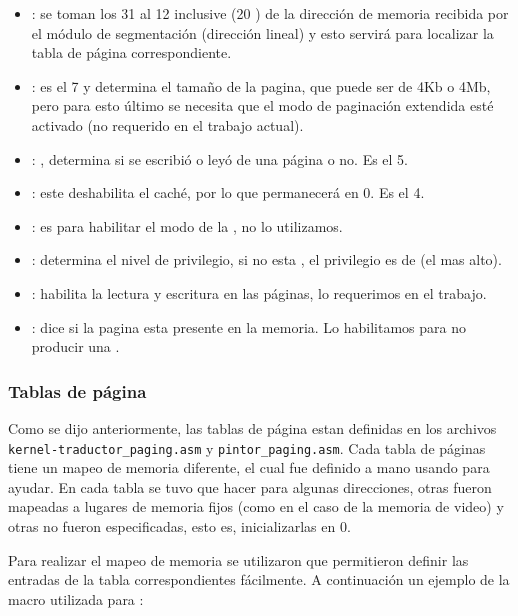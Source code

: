 \begin{itemize}
	\item{}: se toman los  31 al 12 inclusive (20 ) de la dirección de memoria recibida por el módulo 
de segmentación (dirección lineal) y esto servirá para localizar la tabla de página correspondiente.
	\item{}: es el  7 y determina el tamaño de la pagina, que puede ser de 4Kb o 4Mb, pero para esto último se necesita que 
el modo  de paginación extendida esté activado (no requerido en el trabajo actual).
	\item{}: , determina si se escribió o leyó de una página o no. Es el  5.
	\item{}: este  deshabilita el caché, por lo que permanecerá en 0. Es el  4.
	\item{}: es para habilitar el modo  de la , no lo utilizamos.
	\item{}: determina el nivel de privilegio, si no esta , el privilegio es de  (el mas alto). 
	\item{}: habilita la lectura y escritura en las páginas, lo requerimos en el trabajo.
	\item{}: dice si la pagina esta presente en la memoria. Lo habilitamos para no producir una .
\end{itemize}
	
\subsubsection{Tablas de página} 
	Como se dijo anteriormente, las tablas de página estan definidas en los archivos \verb=kernel-traductor_paging.asm= y \verb=pintor_paging.asm=. Cada 
tabla de páginas tiene un mapeo de memoria diferente, el cual fue definido a mano usando  para ayudar. En cada tabla se tuvo que hacer 
 para algunas direcciones, otras fueron mapeadas a lugares de memoria fijos (como en el caso de la memoria de video) y otras no 
fueron especificadas, esto es, inicializarlas en 0.

	Para realizar el mapeo de memoria se utilizaron  que permitieron definir las entradas de la tabla correspondientes fácilmente. A 
continuación un ejemplo de la macro utilizada para :

